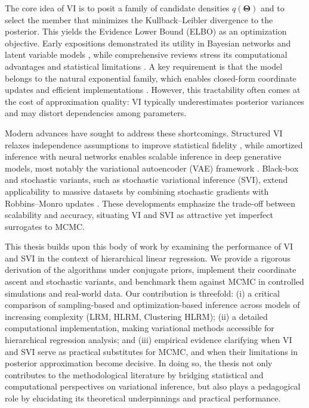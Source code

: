 \medskip

The core idea of VI is to posit a family of candidate densities $q(\bm{\Theta})$ and to select the member that minimizes the Kullback–Leibler divergence to the posterior. This yields the Evidence Lower Bound (ELBO) as an optimization objective. Early expositions demonstrated its utility in Bayesian networks and latent variable models \cite{Blei2006-kd, Ormerod2010-bc}, while comprehensive reviews stress its computational advantages and statistical limitations \cite{Blei2016VariationalIA, zhang2018advancesvariationalinference}. A key requirement is that the model belongs to the natural exponential family, which enables closed-form coordinate updates and efficient implementations \cite{Diaconis1979-lb, NIPS2000_77369e37}. However, this tractability often comes at the cost of approximation quality: VI typically underestimates posterior variances and may distort dependencies among parameters.

\medskip

Modern advances have sought to address these shortcomings. Structured VI relaxes independence assumptions to improve statistical fidelity \cite{wang22g}, while amortized inference with neural networks enables scalable inference in deep generative models, most notably the variational autoencoder (VAE) framework \cite{VAE}. Black-box and stochastic variants, such as stochastic variational inference (SVI), extend applicability to massive datasets by combining stochastic gradients with Robbins–Monro updates \cite{HOFFMAN, RANGAN}. These developments emphasize the trade-off between scalability and accuracy, situating VI and SVI as attractive yet imperfect surrogates to MCMC.

\medskip

This thesis builds upon this body of work by examining the performance of VI and SVI in the context of hierarchical linear regression. We provide a rigorous derivation of the algorithms under conjugate priors, implement their coordinate ascent and stochastic variants, and benchmark them against MCMC in controlled simulations and real-world data. Our contribution is threefold:  
(i) a critical comparison of sampling-based and optimization-based inference across models of increasing complexity (LRM, HLRM, Clustering HLRM);  
(ii) a detailed computational implementation, making variational methods accessible for hierarchical regression analysis; and  
(iii) empirical evidence clarifying when VI and SVI serve as practical substitutes for MCMC, and when their limitations in posterior approximation become decisive.  
In doing so, the thesis not only contributes to the methodological literature by bridging statistical and computational perspectives on variational inference, but also plays a pedagogical role by elucidating its theoretical underpinnings and practical performance.


